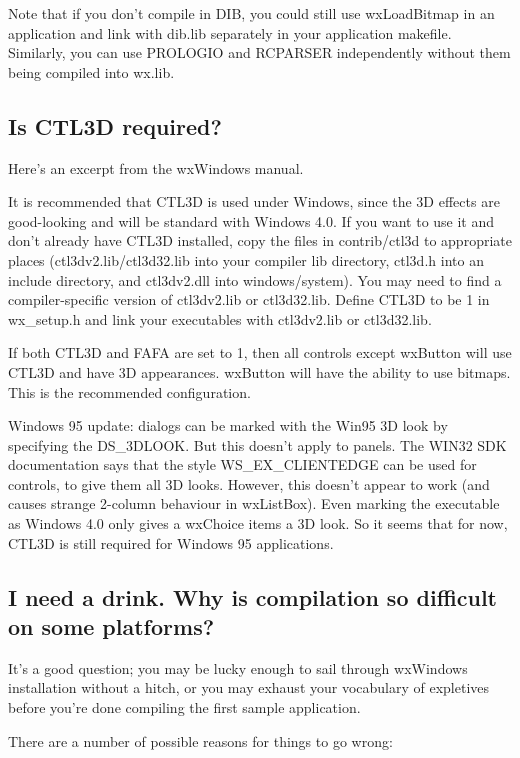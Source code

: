 Note that if you don't compile in DIB, you could still use wxLoadBitmap in an application
and link with dib.lib separately in your application makefile. Similarly, you can use PROLOGIO and RCPARSER
independently without them being compiled into wx.lib.

\subsection{Is CTL3D required?}

Here's an excerpt from the wxWindows manual.

It is recommended that CTL3D is used under Windows, since the 3D effects
are good-looking and will be standard with Windows 4.0. If you want to
use it and don't already have CTL3D installed, copy the files in
contrib/ctl3d to appropriate places (ctl3dv2.lib/ctl3d32.lib into your compiler lib
directory, ctl3d.h into an include directory, and ctl3dv2.dll into
windows/system). You may need to find a compiler-specific version of ctl3dv2.lib
or ctl3d32.lib. Define CTL3D to be 1 in wx\_setup.h and link your executables with ctl3dv2.lib
or ctl3d32.lib.

If both CTL3D and FAFA are set to 1, then all controls except wxButton
will use CTL3D and have 3D appearances. wxButton will have the ability
to use bitmaps. This is the recommended configuration.

Windows 95 update: dialogs can be marked with the Win95 3D look
by specifying the DS\_3DLOOK. But this doesn't apply to panels.
The WIN32 SDK documentation says that the style WS\_EX\_CLIENTEDGE can be
used for controls, to give them all 3D looks. However, this doesn't appear to
work (and causes strange 2-column behaviour in wxListBox). Even marking the
executable as Windows 4.0 only gives a wxChoice items a 3D look.
So it seems that for now, CTL3D is still required for Windows 95 applications.

\subsection{I need a drink. Why is compilation so difficult on some platforms?}

It's a good question; you may be lucky enough to sail through wxWindows
installation without a hitch, or you may exhaust your vocabulary of
expletives before you're done compiling the first sample application.

There are a number of possible reasons for things to go wrong:

